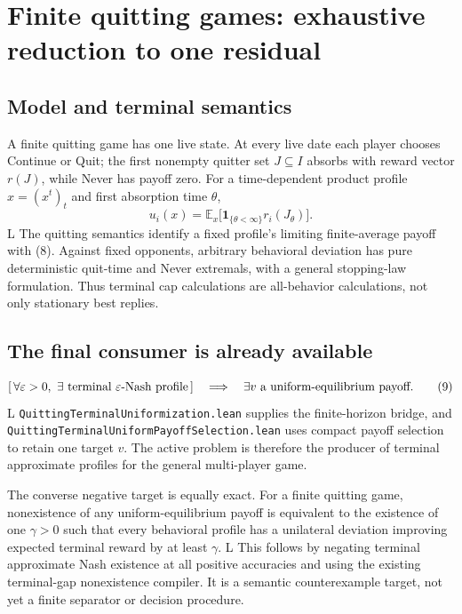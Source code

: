 \documentclass[11pt]{article}
\newcommand{\EE}{\mathbb E}
\newcommand{\one}{\mathbf 1}
\newcommand{\LTag}{\textsf{L}}
\newcommand{\Prod}{\LTag}
\newcommand{\Status}[1]{#1}
\begin{document}
\section{Finite quitting games: exhaustive reduction to one residual}

\subsection{Model and terminal semantics}

A finite quitting game has one live state.  At every live date each player
chooses Continue or Quit; the first nonempty quitter set \(J\subseteq I\)
absorbs with reward vector \(r(J)\), while Never has payoff zero.  For a
time-dependent product profile \(x=(x^t)_t\) and first absorption time
\(\theta\),
\[
 u_i(x)=\EE_x\bigl[\one_{\{\theta<\infty\}}r_i(J_\theta)\bigr].
\tag{8}
\]
\Status{\Prod} The quitting semantics identify a fixed profile's limiting
finite-average payoff with (8).  Against fixed opponents, arbitrary
behavioral deviation has pure deterministic quit-time and Never extremals,
with a general stopping-law formulation.  Thus terminal cap calculations are
all-behavior calculations, not only stationary best replies.

\subsection{The final consumer is already available}

\[
 [\,\forall\varepsilon>0,\ \exists\hbox{ terminal }
 \varepsilon\hbox{-Nash profile}\,]
 \quad\Longrightarrow\quad
 \exists v\ \hbox{a uniform-equilibrium payoff}.
\tag{9}
\]
\Status{\Prod} \texttt{QuittingTerminalUniformization.lean} supplies the
finite-horizon bridge, and
\texttt{QuittingTerminalUniformPayoffSelection.lean} uses compact payoff
selection to retain one target \(v\).  The active problem is therefore the
producer of terminal approximate profiles for the general multi-player game.

The converse negative target is equally exact.  For a finite quitting game,
nonexistence of any uniform-equilibrium payoff is equivalent to the existence
of one \(\gamma>0\) such that every behavioral profile has a unilateral
deviation improving expected terminal reward by at least \(\gamma\).
\Status{\Prod} This follows by negating terminal approximate Nash existence at
all positive accuracies and using the existing terminal-gap nonexistence
compiler.  It is a semantic counterexample target, not yet a finite separator
or decision procedure.
\end{document}

